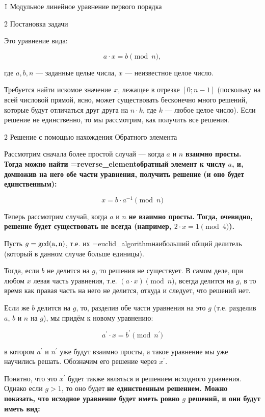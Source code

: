 \h1{ Модульное линейное уравнение первого порядка }

\h2{ Постановка задачи }

Это уравнение вида:

$$a \cdot x = b \pmod n,$$

где $a, b, n$ --- заданные целые числа, $x$ --- неизвестное целое число.

Требуется найти искомое значение $x$, лежащее в отрезке $[0; n-1]$ (поскольку на всей числовой прямой, ясно, может существовать бесконечно много решений, которые будут отличаться друг друга на $n \cdot k$, где $k$ --- любое целое число). Если решение не единственно, то мы рассмотрим, как получить все решения.


\h2{ Решение с помощью нахождения Обратного элемента }

Рассмотрим сначала более простой случай --- когда $a$ и $n$ \bf{взаимно просты}. Тогда можно найти \algohref=reverse_element{обратный элемент} к числу $a$, и, домножив на него обе части уравнения, получить решение (и оно будет \bf{единственным}):

$$x = b \cdot a^{-1} \pmod n$$

Теперь рассмотрим случай, когда $a$ и $n$ \bf{не взаимно просты}. Тогда, очевидно, решение будет существовать не всегда (например, $2 \cdot x = 1 \pmod 4$).

Пусть $g = {\rm gcd(a,n)}$, т.е. их \algohref=euclid_algorithm{наибольший общий делитель} (который в данном случае больше единицы).

Тогда, если $b$ не делится на $g$, то решения не существует. В самом деле, при любом $x$ левая часть уравнения, т.е. $(a \cdot x) \pmod n$, всегда делится на $g$, в то время как правая часть на него не делится, откуда и следует, что решений нет.

Если же $b$ делится на $g$, то, разделив обе части уравнения на это $g$ (т.е. разделив $a$, $b$ и $n$ на $g$), мы придём к новому уравнению:

$$a^\prime \cdot x = b^\prime \pmod {n^\prime}$$

в котором $a^\prime$ и $n^\prime$ уже будут взаимно просты, а такое уравнение мы уже научились решать. Обозначим его решение через $x^\prime$.

Понятно, что это $x^\prime$ будет также являться и решением исходного уравнения. Однако если $g > 1$, то оно будет \bf{не единственным} решением. Можно показать, что исходное уравнение будет иметь ровно $g$ решений, и они будут иметь вид:

